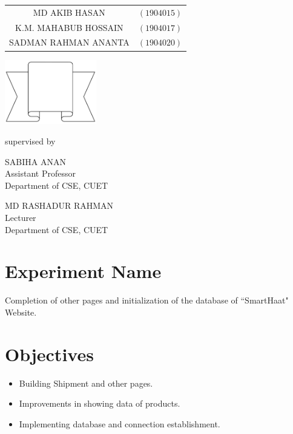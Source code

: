 \documentclass[a4paper,12pt]{report}
\begin{document}
\begin{titlepage}
{		\begin{tabular}{cl}
			MD AKIB HASAN        & $(1904015)$ \\
K.M. MAHABUB HOSSAIN & $(1904017)$ \\
			SADMAN RAHMAN ANANTA & $(1904020)$ \\
		\end{tabular}
	}
	\parbox[r]{7cm}{
		\vspace{1cm}
		\begin{center}
			\includegraphics[width=4cm, keepaspectratio]{remarks.png}
		\end{center}
	}

	\vspace{0.5cm}
	supervised by

	\parbox[l]{8cm}{\begin{center}

			SABIHA ANAN\\
\footnotesize{Assistant Professor\\
				Department of CSE, CUET}
		\end{center}
	}
	\parbox[r]{8cm}{\begin{center}

			MD RASHADUR RAHMAN\\
\footnotesize{Lecturer \\
				Department of CSE, CUET}
		\end{center}
	}

	\vfill
\end{titlepage}


\onehalfspacing

\section*{Experiment Name}
Completion of other pages and initialization of the database of ``SmartHaat" Website.
\section*{Objectives}
\begin{itemize}
\item Building Shipment and other pages.
\item Improvements in showing data of products.
\item Implementing database and connection establishment.
\end{itemize}
\end{document}
